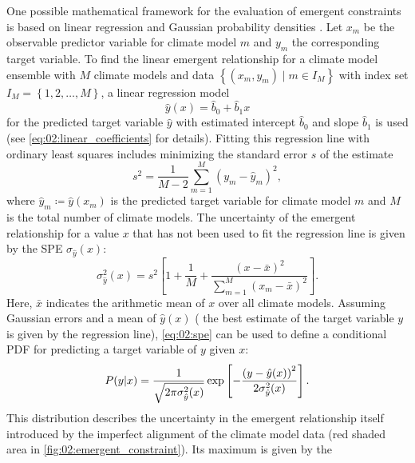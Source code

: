One possible mathematical framework for the evaluation of emergent constraints
is based on linear regression and Gaussian probability densities
\autocite{Cox2013, Cox2018}. Let $x_m$ be the observable predictor variable for
climate model $m$ and $y_m$ the corresponding target variable. To find the
linear emergent relationship for a climate model ensemble with $M$ climate
models and data $\left\{ \left( x_m, y_m \right) \mid m \in I_M \right\}$ with
index set $I_M = \left\{ 1, 2, \ldots, M \right\}$, a linear
regression model
\begin{equation}
  \hat{y}(x) = \hat{b}_0 + \hat{b}_1 x
  \label{eq:02:linear_regression_y}
\end{equation}
for the predicted target variable $\hat{y}$ with estimated intercept
$\hat{b}_0$ and slope $\hat{b}_1$ is used (see \cref{eq:02:linear_coefficients}
for details). Fitting this regression line with ordinary least squares includes
minimizing the standard error $s$ of the estimate
\begin{equation}
  s^2 = \frac{1}{M - 2} \sum_{m=1}^M \left( y_m - \hat{y}_m \right)^2,
  \label{eq:02:sse}
\end{equation}
where $\hat{y}_m \coloneq \hat{y}(x_m)$ is the predicted target variable for
climate model $m$ and $M$ is the total number of climate models. The
uncertainty of the emergent relationship for a value $x$ that has not been used
to fit the regression line is given by the \ac{SPE} $\sigma_{\hat{y}}(x)$:
\begin{equation}
  \sigma_{\hat{y}}^2(x) = s^2 \left[ 1 + \frac{1}{M} + \frac{\left( x - \bar{x}
    \right)^2}{\sum_{m=1}^M \left( x_m - \bar{x} \right)^2} \right].
  \label{eq:02:spe}
\end{equation}
Here, $\bar{x}$ indicates the arithmetic mean of $x$ over all climate models.
Assuming Gaussian errors and a mean of $\hat{y}(x)$ (\ie{} the best estimate of
the target variable $y$ is given by the regression line), \cref{eq:02:spe} can
be used to define a conditional \acf{PDF} for predicting a target variable of
$y$ given $x$:
\begin{equation}
  P(y|x) = \frac{1}{\sqrt{2 \pi \sigma_{\hat{y}}^2(x)}} \exp \left[
    -\frac{\left( y - \hat{y}(x) \right)^2}{2 \sigma_{\hat{y}}^2(x)} \right].
  \label{eq:02:pdf_y_given_x}
\end{equation}
This distribution describes the uncertainty in the emergent relationship itself
introduced by the imperfect alignment of the climate model data (red shaded
area in \cref{fig:02:emergent_constraint}). Its maximum is given by the
